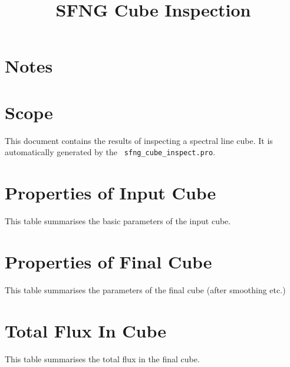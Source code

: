 \documentclass[11pt]{article}
\begin{document}
\title{SFNG Cube Inspection}

\maketitle


\section{Notes}
\label{sect:notes}


\section{Scope}
\label{sec:scope}

\noindent This document contains the results of inspecting a spectral
line cube. It is automatically generated by the {\tt
  sfng\_cube\_inspect.pro}.

\section{Properties of Input Cube}
\label{sect:input_cube}
\noindent This table summarises the basic parameters of the input cube.


\section{Properties of Final Cube}
\label{sect:final_cube}
\noindent This table summarises the parameters of the final cube (after smoothing etc.)


\section{Total Flux In Cube}
\label{sect:totflux}
\noindent  This table summarises the total flux in the final cube.

\end{document}
